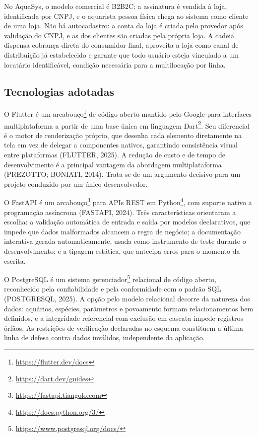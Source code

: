 \documentclass[12pt,oneside,a4paper,brazilian]{abntex2}
\begin{document}
No AquaSys, o modelo comercial é B2B2C: a assinatura é vendida à loja, identificada por CNPJ, e o aquarista pessoa física chega ao sistema como cliente de uma loja. Não há autocadastro: a conta da loja é criada pelo provedor após validação do CNPJ, e as dos clientes são criadas pela própria loja. A cadeia dispensa cobrança direta do consumidor final, aproveita a loja como canal de distribuição já estabelecido e garante que todo usuário esteja vinculado a um locatário identificável, condição necessária para a multilocação por linha.


\subsection{Tecnologias adotadas}
O Flutter é um arcabouço\footnote{\url{https://flutter.dev/docs}} de código aberto mantido pelo Google para interfaces multiplataforma a partir de uma base única em linguagem Dart\footnote{\url{https://dart.dev/guides}}. Seu diferencial é o motor de renderização próprio, que desenha cada elemento diretamente na tela em vez de delegar a componentes nativos, garantindo consistência visual entre plataformas (FLUTTER, 2025). A redução de custo e de tempo de desenvolvimento é a principal vantagem da abordagem multiplataforma (PREZOTTO; BONIATI, 2014). Trata-se de um argumento decisivo para um projeto conduzido por um único desenvolvedor.

O FastAPI é um arcabouço\footnote{\url{https://fastapi.tiangolo.com}} para APIs REST em Python\footnote{\url{https://docs.python.org/3/}}, com suporte nativo a programação assíncrona (FASTAPI, 2024). Três características orientaram a escolha: a validação automática de entrada e saída por modelos declarativos, que impede que dados malformados alcancem a regra de negócio; a documentação interativa gerada automaticamente, usada como instrumento de teste durante o desenvolvimento; e a tipagem estática, que antecipa erros para o momento da escrita.

O PostgreSQL é um sistema gerenciador\footnote{\url{https://www.postgresql.org/docs/}} relacional de código aberto, reconhecido pela confiabilidade e pela conformidade com o padrão SQL (POSTGRESQL, 2025). A opção pelo modelo relacional decorre da natureza dos dados: aquários, espécies, parâmetros e povoamento formam relacionamentos bem definidos, e a integridade referencial com exclusão em cascata impede registros órfãos. As restrições de verificação declaradas no esquema constituem a última linha de defesa contra dados inválidos, independente da aplicação.
\end{document}
